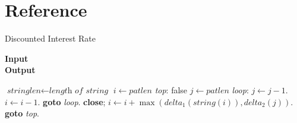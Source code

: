 


\chapter{Reference}\label{sec:something}

    \begin{algorithm}
    \caption{Discounted Interest Rate}\label{euclid}
    \hspace*{\algorithmicindent} \textbf{Input} \\
    \hspace*{\algorithmicindent} \textbf{Output} 
    \begin{algorithmic}[1]
    \State $\textit{stringlen} \gets \textit{length of } \textit{string}$
    \State $i \gets \textit{patlen}$
    \BState \emph{top}:
     \Return false
    \EndIf
    \State $j \gets \textit{patlen}$
    \BState \emph{loop}:
    \State $j \gets j-1$.
    \State $i \gets i-1$.
    \State \textbf{goto} \emph{loop}.
    \State \textbf{close};
    \EndIf
    \State $i \gets i+\max(\textit{delta}_1(\textit{string}(i)),\textit{delta}_2(j))$.
    \State \textbf{goto} \emph{top}.
    \EndProcedure
    \end{algorithmic}
    \end{algorithm}

 \cleardoublepage

